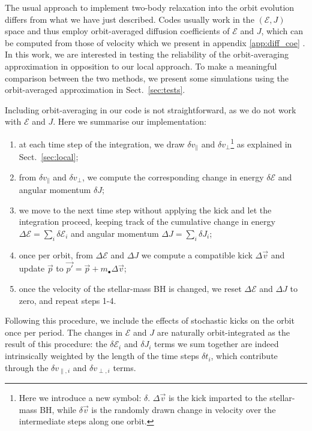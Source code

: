 \documentclass[desactivate]{aa}
\begin{document}
        The usual approach to implement two-body relaxation into the orbit evolution differs from what we have just described. Codes usually work in the $(\mathcal{E}, J)$ space and thus employ orbit-averaged diffusion coefficients of $\mathcal{E}$ and $J$, which can be computed from those of velocity which we present in appendix \ref{app:diff_coe} \citep[see][]{2008gady.book.....B,2013degn.book.....M}.
        In this work, we are interested in testing the reliability of the orbit-averaging approximation in opposition to our local approach. To make a meaningful comparison between the two methods, we present some simulations using the orbit-averaged approximation in Sect.\ \ref{sec:tests}.

        Including orbit-averaging in our code is not straightforward, as we do not work with $\mathcal{E}$ and $J$. Here we summarise our implementation:
        \begin{enumerate}
            \item at each time step of the integration, we draw $\delta v_\parallel$ and $\delta v_\perp$\footnote{Here we introduce a new symbol: $\delta$. $\Delta \vec{v}$ is the kick imparted to the stellar-mass BH, while $\delta \vec{v}$ is the randomly drawn change in velocity over the intermediate steps along one orbit.} as explained in Sect.\ \ref{sec:local};
            \item from $\delta v_\parallel$ and $\delta v_\perp$, we compute the corresponding change in energy $\delta \mathcal{E}$ and angular momentum $\delta J$;
            \item we move to the next time step without applying the kick and let the integration proceed, keeping track of the cumulative change in energy $\Delta \mathcal{E} = \sum_i \delta \mathcal{E}_i$ and angular momentum $\Delta J = \sum_i \delta J_i$;
            \item once per orbit, from $\Delta \mathcal{E}$ and $\Delta J$ we compute a compatible kick $\Delta \vec{v}$ and update $\vec{p}$ to $\vec{p'} = \vec{p} + m_\bullet \Delta \vec{v}$;
            \item once the velocity of the stellar-mass BH is changed, we reset $\Delta \mathcal{E}$ and $\Delta J$ to zero, and repeat steps 1-4.     \end{enumerate}        
        Following this procedure, we include the effects of stochastic kicks on the orbit once per period. The changes in $\mathcal{E}$ and $J$ are naturally orbit-integrated as the result of this procedure: the $\delta \mathcal{E}_i$ and $\delta J_i$ terms we sum together are indeed intrinsically weighted by the length of the time steps $\delta t_i$, which contribute through the $\delta v_{\parallel, i}$ and $\delta v_{\perp, i}$ terms.
\end{document}
